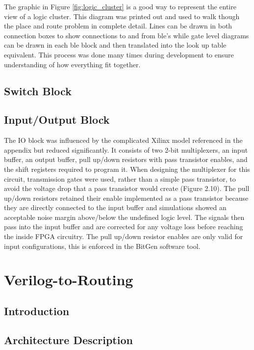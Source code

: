 \documentclass[12pt]{article}
\begin{document}
The graphic in Figure \ref{fig:logic_cluster} is a good way to represent the entire view
of a logic cluster. This diagram was printed out and used to walk though the place and route problem in
complete detail. Lines can be drawn in both connection boxes to show connections to and from ble's while
gate level diagrams can be drawn in each ble block and then translated into the look up table
equivalent. This process was done many times during development to ensure understanding of
how everything fit together.

\subsection{Switch Block}


\subsection{Input/Output Block}

The IO block was influenced by the complicated Xilinx model referenced in the 
appendix but reduced significantly. It consists of two 2-bit multiplexers, an 
input buffer, an output buffer, pull up/down resistors with pass transistor 
enables, and the shift registers required to program it. When designing the 
multiplexer for this circuit, transmission gates were used, rather than a 
simple pass transistor, to avoid the voltage drop that a pass transistor 
would create (Figure 2.10). The pull up/down resistors retained their enable 
implemented as a pass transistor because they are directly connected to the 
input buffer and simulations showed an acceptable noise margin above/below 
the undefined logic level. The signals then pass into the input buffer and 
are corrected for any voltage loss before reaching the inside FPGA circuitry. 
The pull up/down resistor enables are only valid for input configurations, 
this is enforced in the BitGen software tool.

\newpage
\section{Verilog-to-Routing}

\subsection{Introduction}

\subsection{Architecture Description}
\end{document}
